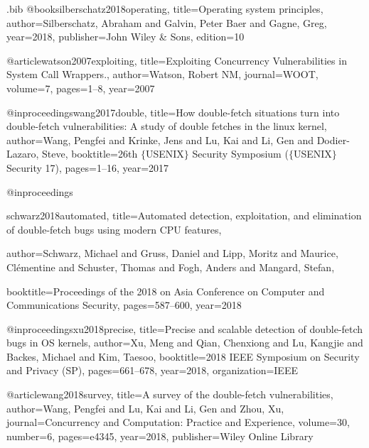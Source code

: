 \usepackage{filecontents}

\usepackage{listings}
\usepackage{parcolumns}
\usepackage{graphicx}
\usepackage{caption}
\usepackage{subcaption}
\usepackage{cleveref}

\newcommand{\pra}[1]{\textcolor{blue}{\textbf{PS:}#1}}

\begin{filecontents}{\jobname.bib}
@book{silberschatz2018operating,
  title={Operating system principles},
  author={Silberschatz, Abraham and Galvin, Peter Baer and Gagne, Greg},
  year={2018},
  publisher={John Wiley \& Sons},
  edition={10}
}

@article{watson2007exploiting,
  title={Exploiting Concurrency Vulnerabilities in System Call Wrappers.},
  author={Watson, Robert NM},
  journal={WOOT},
  volume={7},
  pages={1--8},
  year={2007}
}

@inproceedings{wang2017double,
  title={How double-fetch situations turn into double-fetch vulnerabilities: A 
  study of double fetches in the linux kernel},
  author={Wang, Pengfei and Krinke, Jens and Lu, Kai and Li, Gen and 
  Dodier-Lazaro, Steve},
  booktitle={26th $\{$USENIX$\}$ Security Symposium 
  ($\{$USENIX$\}$ Security 17)},
  pages={1--16},
  year={2017}
}

@inproceedings{schwarz2018automated,
  title={Automated detection, exploitation, and elimination of double-fetch bugs
   using modern CPU features},

  author={Schwarz, Michael and Gruss, Daniel and Lipp, Moritz and Maurice,
  Cl{\'e}mentine and Schuster, Thomas and Fogh, Anders and Mangard, Stefan},

  booktitle={Proceedings of the 2018 on Asia Conference on Computer and Communications Security},
  pages={587--600},
  year={2018}
}

@inproceedings{xu2018precise,
  title={Precise and scalable detection of double-fetch bugs in OS kernels},
  author={Xu, Meng and Qian, Chenxiong and Lu, Kangjie and Backes, Michael
   and Kim, Taesoo},
  booktitle={2018 IEEE Symposium on Security and Privacy (SP)},
  pages={661--678},
  year={2018},
  organization={IEEE}
}

@article{wang2018survey,
  title={A survey of the double-fetch vulnerabilities},
  author={Wang, Pengfei and Lu, Kai and Li, Gen and Zhou, Xu},
  journal={Concurrency and Computation: Practice and Experience},
  volume={30},
  number={6},
  pages={e4345},
  year={2018},
  publisher={Wiley Online Library}
}


\end{filecontents}
